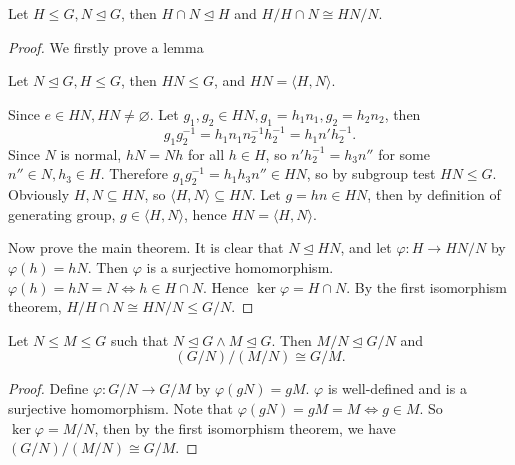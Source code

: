 \documentclass[10pt]{article}
\def\le{\leqslant}
\def\ltrigeq{\trianglelefteq}
\begin{document}
    \begin{corollary}\label{col:2nd Isomorhpism theorem}
            Let $ H\le G, N \ltrigeq G $, then $ H \cap N \ltrigeq H $ and $ H/H \cap N \cong HN/N $.
    \end{corollary}
    \begin{proof}
        We firstly prove a lemma 
        \begin{lemma}
            Let $ N \ltrigeq G, H\le G $, then $HN\le G$, and $ HN=\langle H,N \rangle $.
        \end{lemma}
        Since $ e\in HN, HN\neq \varnothing $. Let $ g_1,g_2\in HN, g_1=h_1n_1, g_2=h_2n_2 $, then
        \[
            g_1g_2^{-1}=h_1n_1 n_2^{-1}h_2^{-1}=h_1n'h_2^{-1}
        .\]
        Since $N$ is normal, $hN=Nh$ for all $h\in H$, so $ n'h_2^{-1}=h_3n'' $ for some $n''\in N, h_3\in H$. Therefore $ g_1g_2^{-1}=h_1h_3n''\in HN $, so by subgroup test $ HN\le G $. Obviously $ H,N \subseteq HN $, so $ \langle H,N \rangle \subseteq HN $. Let $ g=hn\in HN $, then by definition of generating group, $ g\in \langle H,N \rangle $, hence $ HN=\langle H,N \rangle $.

        Now prove the main theorem. It is clear that $ N \ltrigeq HN $, and let $ \varphi: H\to HN/N $ by $ \varphi(h)=hN $. Then $ \varphi $ is a surjective homomorphism. $ \varphi(h)=hN=N \Leftrightarrow h\in H\cap N $. Hence $ \ker \varphi=H \cap N $. By the first isomorphism theorem, $ H/H\cap N \cong HN/N \le G/N $.
    \end{proof}
    \begin{corollary}\label{col:3rd Isomorphism theorem}
            Let $ N \le M \le G $ such that $ N \ltrigeq G \land M \ltrigeq G $. Then $ M /N \ltrigeq G/N $ and 
            \[
                (G/N)/(M/N) \cong G/M
            .\]
    \end{corollary}
    \begin{proof}
        Define $ \varphi:G/N \to G/M $ by $ \varphi(gN)=gM $. $ \varphi $ is well-defined and is a surjective homomorphism. Note that $ \varphi(gN)=gM=M \Leftrightarrow g\in M $. So $ \ker \varphi=M/N $, then by the first isomorphism theorem, we have $ (G/N)/(M/N) \cong G/M $.
    \end{proof}
\end{document}
